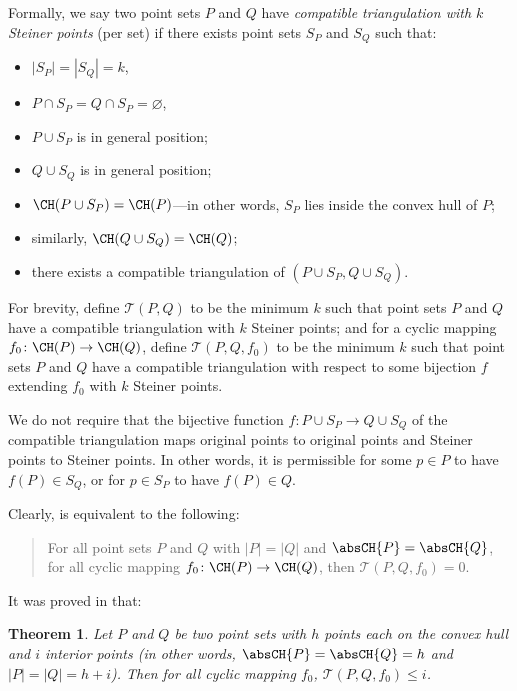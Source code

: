 \documentclass{article}
\let\Cref\crtCref
\theoremstyle{plain}
\newtheorem{theorem}       {Theorem}    [section]
\begin{document}
Formally,
we say two point sets $P$ and $Q$ have \emph{compatible triangulation with $k$ Steiner points} (per set)
if there exists point sets $S_P$ and $S_Q$ such that:
\begin{itemize}
	\item $|S_P|=|S_Q|= k$,
	\item $P \cap S_P = Q \cap S_P = \varnothing$,
	\item $P \cup S_P$ is in general position;
	\item $Q \cup S_Q$ is in general position;
	\item $\CH(P \cup S_P) = \CH(P)$---in other words, $S_P$ lies inside the convex hull of $P$;
	\item similarly, $\CH(Q \cup S_Q) = \CH(Q)$;
	\item there exists a compatible triangulation of $(P \cup S_P, Q \cup S_Q)$.
\end{itemize}

\label{def_script_T}
For brevity, define $\mathcal T(P, Q)$ to be the minimum $k$ such that point sets $P$ and $Q$ have a compatible triangulation
with $k$ Steiner points;
and for a cyclic mapping $f_0\colon \CH(P) \to \CH(Q)$,
define $\mathcal T(P, Q, f_0)$
to be the minimum $k$ such that point sets $P$ and $Q$ have a compatible triangulation with respect to some bijection $f$ extending $f_0$ with $k$ Steiner points.

We do not require that the bijective function $f\colon P \cup S_P \to Q \cup S_Q$ of the compatible triangulation maps original points to original points and Steiner points to Steiner points. In other words, it is permissible for some $p \in P$ to have $f(P) \in S_Q$, or for $p \in S_P$ to have $f(P) \in Q$.

Clearly, \Cref{conjecture:main} is equivalent to the following:
\begin{quote}
	For all point sets $P$ and $Q$ with $|P|=|Q|$ and $\absCH{P}=\absCH{Q}$,
	for all cyclic mapping $f_0 \colon \CH(P) \to \CH(Q)$,
	then $\mathcal T(P, Q, f_0) = 0$.
\end{quote}

It was proved in \cite[Theorem 3]{Aichholzer_2003} that:
\begin{theorem}
	\label{theorem:existing_result_Steiner_point}
	Let $P$ and $Q$ be two point sets with $h$ points each on the convex hull and $i$ interior points
	(in other words, $\absCH{P}=\absCH{Q}=h$ and $|P|=|Q|=h+i$).
	Then for all cyclic mapping $f_0$, $\mathcal T(P, Q, f_0) \leq i$.
\end{theorem}
\end{document}
